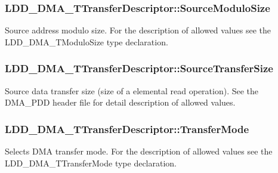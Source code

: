 \subsubsection[{Source\+Modulo\+Size}]{ L\+D\+D\+\_\+\+D\+M\+A\+\_\+\+T\+Transfer\+Descriptor\+::\+Source\+Modulo\+Size}\label{struct_l_d_d___d_m_a___t_transfer_descriptor_a65316d477535d064953174d3eb7eadfe}
Source address modulo size. For the description of allowed values see the L\+D\+D\+\_\+\+D\+M\+A\+\_\+\+T\+Modulo\+Size type declaration. \hypertarget{struct_l_d_d___d_m_a___t_transfer_descriptor_a96068433ffe065c3fa85f7d2f9a9b545}{}
\subsubsection[{Source\+Transfer\+Size}]{ L\+D\+D\+\_\+\+D\+M\+A\+\_\+\+T\+Transfer\+Descriptor\+::\+Source\+Transfer\+Size}\label{struct_l_d_d___d_m_a___t_transfer_descriptor_a96068433ffe065c3fa85f7d2f9a9b545}
Source data transfer size (size of a elemental read operation). See the D\+M\+A\+\_\+\+P\+D\+D header file for detail description of allowed values. \hypertarget{struct_l_d_d___d_m_a___t_transfer_descriptor_a0a932c1e965e131c25e45159f71831fe}{}
\subsubsection[{Transfer\+Mode}]{ L\+D\+D\+\_\+\+D\+M\+A\+\_\+\+T\+Transfer\+Descriptor\+::\+Transfer\+Mode}\label{struct_l_d_d___d_m_a___t_transfer_descriptor_a0a932c1e965e131c25e45159f71831fe}
Selects D\+M\+A transfer mode. For the description of allowed values see the L\+D\+D\+\_\+\+D\+M\+A\+\_\+\+T\+Transfer\+Mode type declaration. \hypertarget{struct_l_d_d___d_m_a___t_transfer_descriptor_a770d0bde209b081eafe87892ed333084}{}
